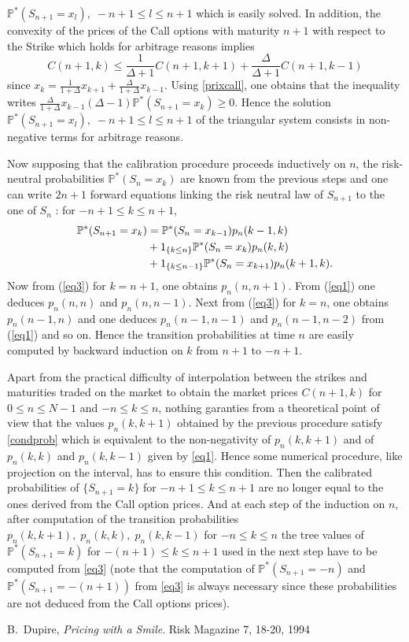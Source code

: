 \documentclass[11pt]{article}
\begin{document}
${\mathbb P}^*(S_{n+1}=x_l),\;-n+1\leq l\leq n+1$ which is easily solved. In
addition, the convexity of the prices of the Call options with maturity
$n+1$ with respect to the Strike which holds for arbitrage reasons implies
$$C(n+1,k)\leq
\frac{1}{\Delta+1}C(n+1,k+1)+\frac{\Delta}{\Delta+1}C(n+1,k-1)$$
 since
 $x_k=\frac{1}{1+\Delta}x_{k+1}+\frac{\Delta}{1+\Delta}x_{k-1}$. Using
 \eqref{prixcall}, one
 obtains that the inequality writes 
$\frac{\Delta}{1+\Delta}x_{k-1}(\Delta -1){\mathbb P}^*(S_{n+1}=x_{k})\geq 0$.
Hence the solution
${\mathbb P}^*(S_{n+1}=x_l),\;-n+1\leq l\leq n+1$ of the triangular
system consists in non-negative terms for arbitrage reasons.\par
Now
supposing that the calibration procedure proceeds inductively on $n$,
the risk-neutral probabilities ${\mathbb P}^*(S_{n}=x_k)$ are known from
the previous steps and one can write $2n+1$ forward equations linking
the risk neutral law of $S_{n+1}$ to the one of $S_n$ : for $-n+1\leq k\leq n+1$,
\begin{align}{\mathbb
    P}^*(S_{n+1}=x_k)&={\mathbb P}^*(S_n=x_{k-1})p_n(k-1,k)\notag\\&+1_{\{k\leq n\}}{\mathbb P}^*(S_n=x_{k})p_n(k,k)\notag\\&+1_{\{k\leq n-1\}}{\mathbb P}^*(S_n=x_{k+1})p_n(k+1,k).
\label{eq3}\end{align}
Now from (\ref{eq3}) for $k=n+1$, one obtains $p_n(n,n+1)$. From
(\ref{eq1}) one deduces $p_n(n,n)$ and $p_n(n,n-1)$. Next from
(\ref{eq3}) for $k=n$, one obtains $p_n(n-1,n)$ and one deduces
$p_n(n-1,n-1)$ and $p_n(n-1,n-2)$ from (\ref{eq1}) and so on. Hence the
transition probabilities at time $n$  are easily computed by backward
induction on $k$ from $n+1$ to $-n+1$.\par
Apart from the practical difficulty of interpolation between the strikes
and maturities traded on the market to obtain the market prices $C(n+1,k)$ for
$0\leq n\leq N-1$ and $-n\leq k\leq n$, nothing garanties from a
theoretical point of view that the values $p_n(k,k+1)$ obtained by the
previous procedure satisfy \eqref{condprob} which is
equivalent to the non-negativity of $p_n(k,k+1)$ and of $p_n(k,k)$ and
$p_n(k,k-1)$ given by \eqref{eq1}. Hence some numerical procedure, like
projection on the interval, has to ensure this condition. Then the
calibrated probabilities of $\{S_{n+1}=k\}$ for $-n+1\leq k\leq n+1$ are no longer equal to the ones
derived from the Call option prices. And at each step of the induction
on $n$, after computation of the transition probabilities
$p_n(k,k+1),\;p_n(k,k),\;p_n(k,k-1)$ for $-n\leq k\leq n$ the tree values of
${\mathbb P}^*(S_{n+1}=k)$ for $-(n+1)\leq k\leq n+1$ used in the next
step have to be computed from \eqref{eq3} (note that the computation of
${\mathbb P}^*(S_{n+1}=-n)$ and ${\mathbb P}^*(S_{n+1}=-(n+1))$ from
\eqref{eq3} is always necessary since these probabilities are not
deduced from the Call options prices). 
\begin{thebibliography}{1}
B.~Dupire,
\emph{Pricing with a Smile}.
Risk Magazine 7, 18-20, 1994
\end{thebibliography}
\end{document}
